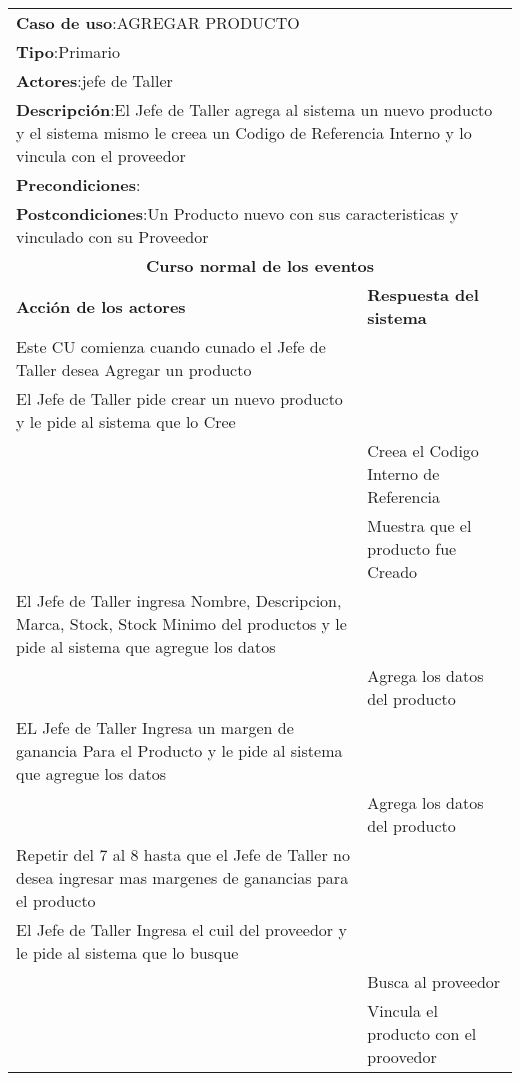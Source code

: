 \begin{longtable}{ |p{8cm}|p{8cm}| }
		\hline
		\multicolumn{2}{|p{16cm}|}{\textbf{Caso de uso}:AGREGAR PRODUCTO }\\
		\multicolumn{2}{|p{16cm}|}{\textbf{Tipo}:Primario }\\
		\multicolumn{2}{|p{16cm}|}{\textbf{Actores}:jefe de Taller }\\
		\multicolumn{2}{|p{16cm}|}{\textbf{Descripción}:El Jefe de Taller agrega al sistema un nuevo producto y el sistema mismo le creea un Codigo de Referencia Interno y lo vincula con el proveedor }\\
		\multicolumn{2}{|p{16cm}|}{\textbf{Precondiciones}: }\\
		\multicolumn{2}{|p{16cm}|}{\textbf{Postcondiciones}:Un Producto nuevo con sus caracteristicas y vinculado con su Proveedor }\\
		\hline
		\multicolumn{2}{|c|}{\textbf{Curso normal de los eventos}}\\
		\hline
		\textbf{Acción de los actores} & \textbf{Respuesta del sistema}\\
		\hline
			\inc Este CU comienza cuando cunado el Jefe de Taller desea Agregar un producto & \\
			\hline
			\inc El Jefe de Taller pide crear un nuevo producto y le pide al sistema que lo Cree &   \\
			\hline
			& \inc Creea el Codigo Interno de Referencia  \\
			\hline
			& \inc Muestra que el producto fue Creado  \\
			\hline
			\inc El Jefe de Taller ingresa Nombre, Descripcion,  Marca, Stock, Stock Minimo del productos y le pide al sistema que agregue los datos &   \\
			\hline
			& \inc Agrega los datos del producto \\
			\hline
			\inc EL Jefe de Taller Ingresa un margen de ganancia Para el Producto y le pide al sistema que agregue los datos &   \\
			\hline
			& \inc Agrega los datos del producto \\
			\hline
			\inc Repetir del 7 al 8 hasta que el Jefe de Taller no desea ingresar mas margenes de ganancias para el producto &  \\
			\hline
			\inc  El Jefe de Taller Ingresa el cuil del proveedor y le pide al sistema que lo busque  &    \\
			\hline
			& \inc Busca al proveedor  \\
			\hline
			& \inc  Vincula el producto con el proovedor  \\

\end{longtable}
